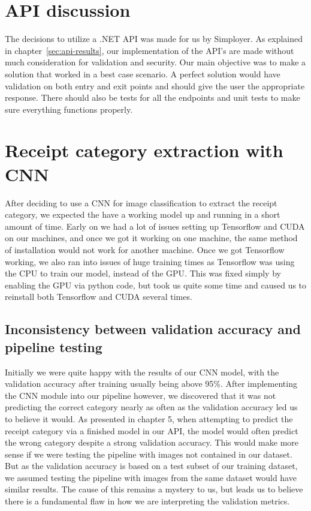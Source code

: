 \section{API discussion}\label{sec:api-discussion}
The decisions to utilize a .NET API was made for us by Simployer.
As explained in chapter~\ref{sec:api-results}, our implementation of the API's are made without much consideration
for validation and security.
Our main objective was to make a solution that worked in a best case scenario.
A perfect solution would have validation on both entry and exit points and should give the user the appropriate
response.
There should also be tests for all the endpoints and unit tests to make sure everything functions properly.

\section{Receipt category extraction with CNN}\label{sec:receipt-category-extraction-with-cnn}
After deciding to use a CNN for image classification to extract the receipt category, we expected the have a working model up and running in a short amount of time.
Early on we had a lot of issues setting up Tensorflow and CUDA on our machines, and once we got it working on one machine, the same method of installation would not work for another machine.
Once we got Tensorflow working, we also ran into issues of huge training times as Tensorflow was using the CPU to train our model, instead of the GPU\@.
This was fixed simply by enabling the GPU via python code, but took us quite some time and caused us to reinstall both Tensorflow and CUDA several times.

\subsection{Inconsistency between validation accuracy and pipeline testing}\label{subsec:inconsistency-between-validation-accuracy-and-pipeline-testing}
Initially we were quite happy with the results of our CNN model, with the validation accuracy after training usually being above 95\%.
After implementing the CNN module into our pipeline however, we discovered that it was not predicting the correct category nearly as often as the validation accuracy led us to believe it would.
As presented in chapter 5, when attempting to predict the receipt category via a finished model in our API, the model would often predict the wrong category despite a strong validation accuracy.
This would make more sense if we were testing the pipeline with images not contained in our dataset.
But as the validation accuracy is based on a test subset of our training dataset, we assumed testing the pipeline with images from the same dataset would have similar results.
The cause of this remains a mystery to us, but leads us to believe there is a fundamental flaw in how we are interpreting the validation metrics.

